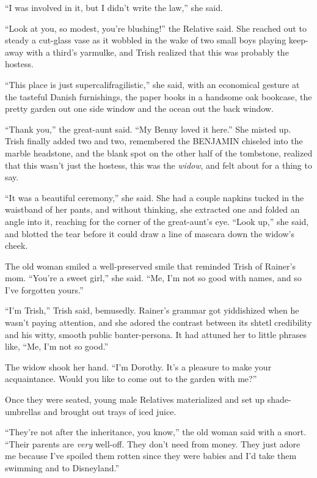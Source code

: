 “I was involved in it, but I didn't write the law,” she said.

“Look at you, so modest, you're blushing!” the Relative said. She 
reached out to steady a cut-glass vase as it wobbled in the wake of two 
small boys playing keep-away with a third's yarmulke, and Trish 
realized that this was probably the hostess.

“This place is just supercalifragilistic,” she said, with an 
economical gesture at the tasteful Danish furnishings, the paper books 
in a handsome oak bookcase, the pretty garden out one side window and 
the ocean out the back window.

“Thank you,” the great-aunt said. “My Benny loved it here.” She 
misted up. Trish finally added two and two, remembered the BENJAMIN 
chiseled into the marble headstone, and the blank spot on the other 
half of the tombstone, realized that this wasn't just the hostess, this 
was the \emph{widow}, and felt about for a thing to say.

“It was a beautiful ceremony,” she said. She had a couple napkins 
tucked in the waistband of her pants, and without thinking, she 
extracted one and folded an angle into it, reaching for the corner of 
the great-aunt's eye. “Look up,” she said, and blotted the tear 
before it could draw a line of mascara down the widow's cheek.

The old woman smiled a well-preserved smile that reminded Trish of 
Rainer's mom. “You're a sweet girl,” she said. “Me, I'm not so 
good with names, and so I've forgotten yours.”

“I'm Trish,” Trish said, bemusedly. Rainer's grammar got 
yiddishized when he wasn't paying attention, and she adored the 
contrast between its shtetl credibility and his witty, smooth public 
banter-persona. It had attuned her to little phrases like, “Me, I'm 
not so good.”

The widow shook her hand. “I'm Dorothy. It's a pleasure to make your 
acquaintance. Would you like to come out to the garden with me?”

\tb

Once they were seated, young male Relatives materialized and set up 
shade-umbrellas and brought out trays of iced juice.

“They're not after the inheritance, you know,” the old woman said 
with a snort. “Their parents are \emph{very} well-off. They don't 
need from money. They just adore me because I've spoiled them rotten 
since they were babies and I'd take them swimming and to Disneyland.”

